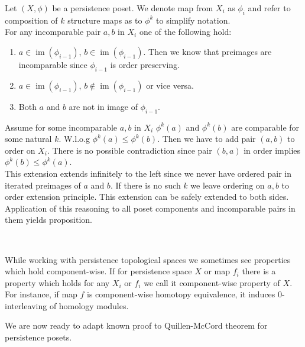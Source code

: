 \begin{pf}
  Let $(X, \phi)$ be a persistence poset. We denote map from $X_i$ as $\phi_i$ and refer to composition of $k$ structure maps as to $\phi^k$ to simplify notation.\\

  For any incomparable pair $a,b$ in $X_i$ one of the following hold:
  \begin{enumerate}
    \item $a \in \operatorname{im}(\phi_{i-1})$, $b \in \operatorname{im}(\phi_{i-1})$. Then we know that preimages are incomparable since $\phi_{i-1}$ is order preserving.
    \item $a \in \operatorname{im}(\phi_{i-1})$, $b \not\in \operatorname{im}(\phi_{i-1})$ or vice versa.
    \item Both $a$ and $b$ are not in image of $\phi_{i-1}$.
  \end{enumerate}

  Assume for some incomparable $a,b$ in $X_i$ $\phi^k(a)$ and $\phi^k(b)$ are comparable for some natural $k$. W.l.o.g $\phi^k(a) \leq \phi^k(b)$. Then we have to add pair $(a,b)$ to order on $X_i$. There is no possible contradiction since pair $(b,a)$ in order implies $\phi^k(b) \leq \phi^k(a)$.\\
  This extension extends infinitely to the left since we never have ordered pair in iterated preimages of $a$ and $b$. If there is no such $k$ we leave ordering on $a,b$ to order extension principle. This extension can be safely extended to both sides.\\

  Application of this reasoning to all poset components and incomparable pairs in them yields proposition.
\end{pf}\\

\begin{remark}
  While working with persistence topological spaces we sometimes see properties which hold component-wise. If for persistence space $X$ or map $f_i$ there is a property which holds for any $X_i$ or $f_i$ we call it component-wise property of $X$. For instance, if map $f$ is component-wise homotopy equivalence, it induces $0$-interleaving of homology modules.
\end{remark}

We are now ready to adapt known proof to Quillen-McCord theorem for persistence posets.

